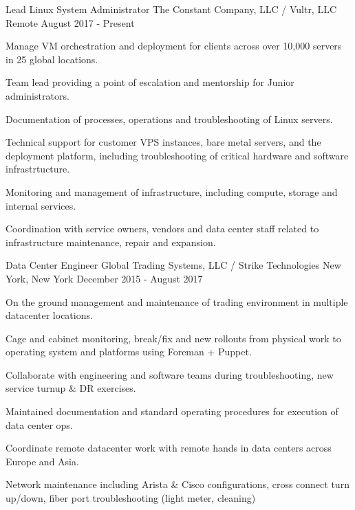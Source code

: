 
\begin{cventries}

	\cventry
	{Lead Linux System Administrator}
	{The Constant Company, LLC / Vultr, LLC}
	{Remote}
	{August 2017 - Present}
	{
		\begin{cvitems}
		\item {Manage VM orchestration and deployment for clients across over 10,000 servers in 25 global locations.}
		\item {Team lead providing a point of escalation and mentorship for Junior administrators.}
		\item {Documentation of processes, operations and troubleshooting of Linux servers.}
		\item {Technical support for customer VPS instances, bare metal servers, and the deployment platform, including troubleshooting of critical hardware and software infrastrtucture.}
		\item {Monitoring and management of infrastructure, including compute, storage and internal services.}
		\item {Coordination with service owners, vendors and data center staff related to infrastructure maintenance, repair and expansion.}
		\end{cvitems}
	}


	\cventry
	{Data Center Engineer}
	{Global Trading Systems, LLC / Strike Technologies}
	{New York, New York}
	{December 2015 - August 2017}
	{
		\begin{cvitems}
		\item {On the ground management and maintenance of trading environment in multiple datacenter locations.}
		\item {Cage and cabinet monitoring, break/fix and new rollouts from physical work to operating system and platforms using Foreman + Puppet.}
		\item {Collaborate with engineering and software teams during troubleshooting, new service turnup & DR exercises.}
		\item {Maintained documentation and standard operating procedures for execution of data center ops.}
		\item {Coordinate remote datacenter work with remote hands in data centers across Europe and Asia.}
		\item {Network maintenance including Arista & Cisco configurations, cross connect turn up/down, fiber port troubleshooting (light meter, cleaning)}
		\end{cvitems}
	}


\end{cventries}
